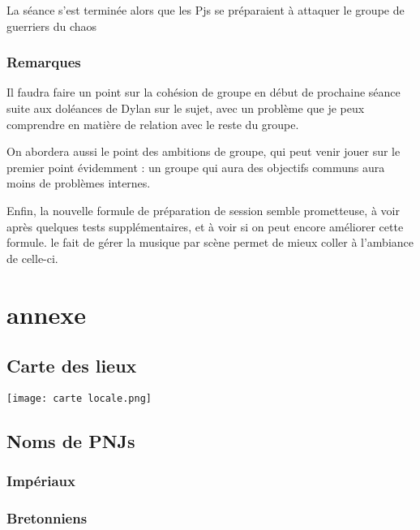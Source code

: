 \documentclass[10pt,a4paper]{book}
\begin{document}
La séance s'est terminée alors que les Pjs se préparaient à attaquer le groupe de guerriers du chaos 
\subsection{Remarques}
Il faudra faire un point sur la cohésion de groupe en début de prochaine séance suite aux doléances de Dylan sur le sujet, avec un problème que je peux comprendre en matière de relation avec le reste du groupe.

On abordera aussi le point des ambitions de groupe, qui peut venir jouer sur le premier point évidemment : un groupe qui aura des objectifs communs aura moins de problèmes internes.

Enfin, la nouvelle formule de préparation de session semble prometteuse, à voir après quelques tests supplémentaires, et à voir si on peut encore améliorer cette formule. le fait de gérer la musique par scène permet de mieux coller à l'ambiance de celle-ci.
\chapter*{annexe}
\section{Carte des lieux}
\texttt{[image: carte locale.png]}
\section*{Noms de PNJs}
\subsection*{Impériaux}
\subsection*{Bretonniens}
\end{document}
